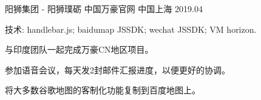 \begin{cventries}
    
    \cventry
    {阳狮集团 - 阳狮璞砺} %
    {中国万豪官网} %
    {中国上海} %
    {2019.04} %
    {
      \begin{cvitems} %
        \item {技术: handlebar.js; baidumap JSSDK; wechat JSSDK; VM horizon.}
        \item {与印度团队一起完成万豪CN地区项目。}
        \item {参加语音会议，每天发2封邮件汇报进度，以便更好的协调。}
        \item {将大多数谷歌地图的客制化功能复制到百度地图上。}
      \end{cvitems}
    }




\end{cventries}
